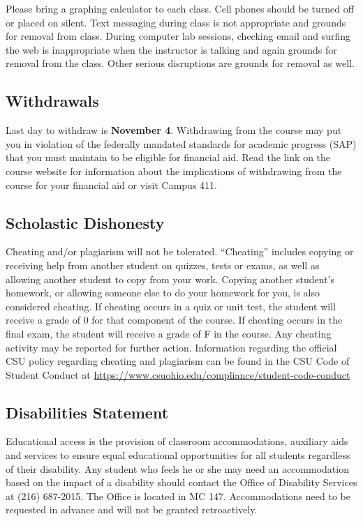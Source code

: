 \documentclass[12pt]{article}
\begin{document}
Please bring a graphing calculator to each class.  Cell phones should be turned off or placed on silent.
Text messaging during class is not appropriate and grounds for removal from class.  During computer lab 
sessions, checking email and surfing the web is inappropriate when the instructor is talking and again 
grounds for removal from the class.  Other serious disruptions are grounds for removal as well.

\subsection{Withdrawals}
Last day to withdraw is \textbf{November 4}. Withdrawing from the course may put you in violation
of the federally mandated standards for academic progress (SAP) that you must maintain to be eligible for 
financial aid.  Read the link on the course website for information about the implications of withdrawing 
from the course for your financial aid or visit Campus 411.

\subsection{Scholastic Dishonesty}
Cheating and/or plagiarism will not be tolerated. ``Cheating'' includes copying or receiving help from
another student on quizzes, tests or exams, as well as allowing another student to copy from your work. 
Copying another student's homework, or allowing someone else to do your homework for you, is also 
considered cheating. If cheating occurs in a quiz or unit test, the student will receive a grade of 0 for 
that component of the course. If cheating occurs in the final exam, the student will receive a grade of F in 
the course. Any cheating activity may be reported for further action.  Information regarding the official
CSU policy regarding cheating and plagiarism can be found in the  CSU Code of Student Conduct at 
\url{https://www.csuohio.edu/compliance/student-code-conduct}

\subsection{Disabilities Statement} 
Educational access is the provision of classroom accommodations, auxiliary aids and services to ensure 
equal educational opportunities for all students regardless of their disability. Any student who feels 
he or she may need an accommodation based on the impact of a disability should contact the Office of 
Disability Services at (216) 687-2015. The Office is located in MC 147. Accommodations need to be 
requested in advance and will not be granted retroactively.
\end{document}
